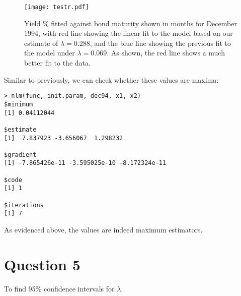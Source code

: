 \documentclass[11pt, a4paper]{article}
\begin{document}
\begin{figure}[!h]
\centering
\texttt{[image: testr.pdf]}
\caption{Yield \% fitted against bond maturity shown in months for December 1994, with red line showing the linear fit to the model based on our estimate of $\lambda = 0.288$, and the blue line showing the previous fit to the model under $\lambda = 0.069$. As shown, the red line shows a much better fit to the data.} 
\end{figure}
 
\clearpage

Similar to previously, we can check whether these values are maxima:
\begin{verbatim}
> nlm(func, init.param, dec94, x1, x2)
$minimum
[1] 0.04112044

$estimate
[1]  7.837923 -3.656067  1.298232

$gradient
[1] -7.865426e-11 -3.595025e-10 -8.172324e-11

$code
[1] 1

$iterations
[1] 7
\end{verbatim}
As evidenced above, the values are indeed maximum estimators.

\section{Question 5}

To find 95\% confidence intervals for $\lambda$. 
\end{document}
